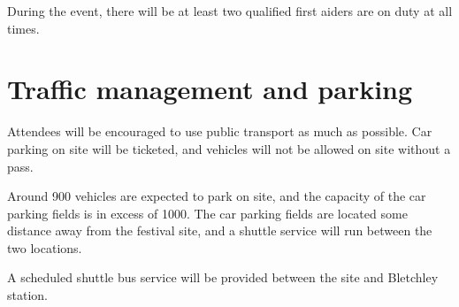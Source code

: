 During the event, there will be at least two qualified first aiders are on duty at all times.

\section{Traffic management and parking}

Attendees will be encouraged to use public transport as much as possible. Car parking on site will be ticketed, and vehicles will not be allowed on site without a pass.

Around 900 vehicles are expected to park on site, and the capacity of the car parking fields is in excess of 1000.
The car parking fields are located some distance away from the festival site, and a shuttle service will run between
the two locations.

A scheduled shuttle bus service will be provided between the site and Bletchley station.

